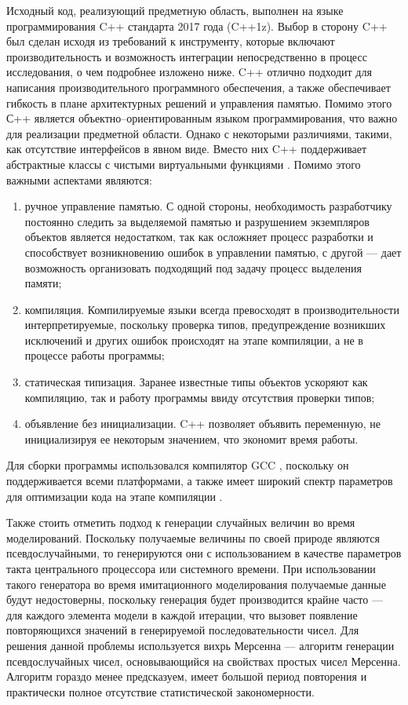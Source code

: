  Исходный код, реализующий предметную область, выполнен на языке программирования C++ стандарта 2017 года (C++1z). Выбор в сторону C++ был сделан исходя из требований к инструменту, которые включают производительность и возможность интеграции непосредственно в процесс исследования, о чем подробнее изложено ниже. C++ отлично подходит для написания производительного программного обеспечения, а также обеспечивает гибкость в плане архитектурных решений и управления памятью. Помимо этого С++ является объектно--ориентированным языком программирования, что важно для реализации предметной области. Однако с некоторыми различиями, такими, как отсутствие интерфейсов в явном виде. Вместо них C++ поддерживает абстрактные классы с чистыми виртуальными функциями \cite{schmid2012c++}.
 Помимо этого важными аспектами являются:
 \begin{enumerate}
 	\item ручное управление памятью. С одной стороны, необходимость разработчику постоянно следить за выделяемой памятью и разрушением экземпляров объектов является недостатком, так как осложняет процесс разработки и способствует возникновению ошибок в управлении памятью, с другой --- дает возможность организовать подходящий под задачу процесс выделения памяти;
 	\item компиляция. Компилируемые языки всегда превосходят в производительности интерпретируемые, поскольку проверка типов, предупреждение возникших исключений и других ошибок происходят на этапе компиляции, а не в процессе работы программы;
 	\item статическая типизация. Заранее известные типы объектов ускоряют как компиляцию, так и работу программы ввиду отсутствия проверки типов;
 	\item объявление без инициализации. C++ позволяет объявить переменную, не инициализируя ее некоторым значением, что экономит время работы.
 \end{enumerate}

 Для сборки программы использовался компилятор GCC \cite{gcc}, поскольку он поддерживается всеми платформами, а также имеет широкий спектр параметров для оптимизации кода на этапе компиляции \cite{branco2015impact}. 
 
 Также стоить отметить подход к генерации случайных величин во время моделирований. Поскольку получаемые величины по своей природе являются псевдослучайными, то генерируются они с использованием в качестве параметров такта центрального процессора или системного времени. При использовании такого генератора во время имитационного моделирования получаемые данные будут недостоверны, поскольку генерация будет производится крайне часто --- для каждого элемента модели в каждой итерации, что вызовет появление повторяющихся значений в генерируемой последовательности чисел. Для решения данной проблемы используется вихрь Мерсенна \cite{matsumoto1998mersenne} --- алгоритм генерации псевдослучайных чисел, основывающийся на свойствах простых чисел Мерсенна. Алгоритм гораздо менее предсказуем, имеет большой период повторения и практически полное отсутствие статистической закономерности. 
 
